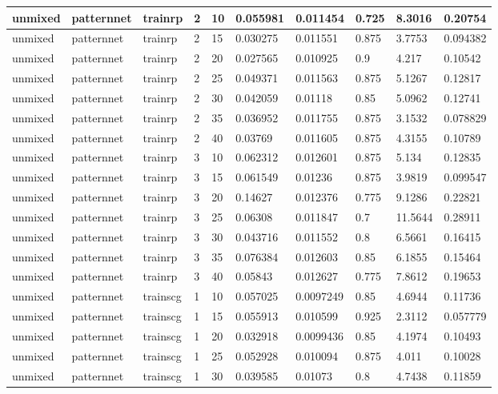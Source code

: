 \begin{longtable}{lllllllll}
unmixed & patternnet & trainrp & 2 & 10 & 0.055981 & 0.011454 & 0.725 & 8.3016 & 0.20754 \\ \hline 
unmixed & patternnet & trainrp & 2 & 15 & 0.030275 & 0.011551 & 0.875 & 3.7753 & 0.094382 \\ \hline 
unmixed & patternnet & trainrp & 2 & 20 & 0.027565 & 0.010925 & 0.9 & 4.217 & 0.10542 \\ \hline 
unmixed & patternnet & trainrp & 2 & 25 & 0.049371 & 0.011563 & 0.875 & 5.1267 & 0.12817 \\ \hline 
unmixed & patternnet & trainrp & 2 & 30 & 0.042059 & 0.01118 & 0.85 & 5.0962 & 0.12741 \\ \hline 
unmixed & patternnet & trainrp & 2 & 35 & 0.036952 & 0.011755 & 0.875 & 3.1532 & 0.078829 \\ \hline 
unmixed & patternnet & trainrp & 2 & 40 & 0.03769 & 0.011605 & 0.875 & 4.3155 & 0.10789 \\ \hline 
unmixed & patternnet & trainrp & 3 & 10 & 0.062312 & 0.012601 & 0.875 & 5.134 & 0.12835 \\ \hline 
unmixed & patternnet & trainrp & 3 & 15 & 0.061549 & 0.01236 & 0.875 & 3.9819 & 0.099547 \\ \hline 
unmixed & patternnet & trainrp & 3 & 20 & 0.14627 & 0.012376 & 0.775 & 9.1286 & 0.22821 \\ \hline 
unmixed & patternnet & trainrp & 3 & 25 & 0.06308 & 0.011847 & 0.7 & 11.5644 & 0.28911 \\ \hline 
unmixed & patternnet & trainrp & 3 & 30 & 0.043716 & 0.011552 & 0.8 & 6.5661 & 0.16415 \\ \hline 
unmixed & patternnet & trainrp & 3 & 35 & 0.076384 & 0.012603 & 0.85 & 6.1855 & 0.15464 \\ \hline 
unmixed & patternnet & trainrp & 3 & 40 & 0.05843 & 0.012627 & 0.775 & 7.8612 & 0.19653 \\ \hline 
unmixed & patternnet & trainscg & 1 & 10 & 0.057025 & 0.0097249 & 0.85 & 4.6944 & 0.11736 \\ \hline 
unmixed & patternnet & trainscg & 1 & 15 & 0.055913 & 0.010599 & 0.925 & 2.3112 & 0.057779 \\ \hline 
unmixed & patternnet & trainscg & 1 & 20 & 0.032918 & 0.0099436 & 0.85 & 4.1974 & 0.10493 \\ \hline 
unmixed & patternnet & trainscg & 1 & 25 & 0.052928 & 0.010094 & 0.875 & 4.011 & 0.10028 \\ \hline 
unmixed & patternnet & trainscg & 1 & 30 & 0.039585 & 0.01073 & 0.8 & 4.7438 & 0.11859 \\ \hline 

\end{longtable}
